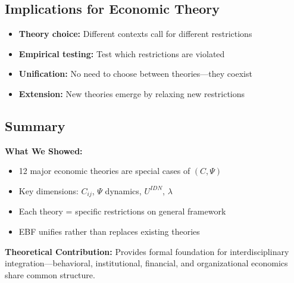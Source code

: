 
\subsection{Implications for Economic Theory}
\label{sec:A-implications}

\begin{itemize}[nosep]
    \item \textbf{Theory choice:} Different contexts call for different restrictions
    \item \textbf{Empirical testing:} Test which restrictions are violated
    \item \textbf{Unification:} No need to choose between theories---they coexist
    \item \textbf{Extension:} New theories emerge by relaxing new restrictions
\end{itemize}



\subsection{Summary}
\label{sec:A-summary}

\begin{tcolorbox}[colback=blue!5!white, colframe=blue!75!black,
    title=\textbf{Summary: Limiting Cases}]

\textbf{What We Showed:}
\begin{itemize}[nosep]
    \item 12 major economic theories are special cases of $(C, \Psi)$
    \item Key dimensions: $C_{ij}$, $\Psi$ dynamics, $U^{IDN}$, $\lambda$
    \item Each theory = specific restrictions on general framework
    \item EBF unifies rather than replaces existing theories
\end{itemize}

\textbf{Theoretical Contribution:}
Provides formal foundation for interdisciplinary integration---behavioral,
institutional, financial, and organizational economics share common structure.

\end{tcolorbox}

